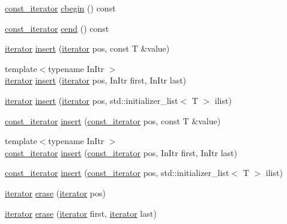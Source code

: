 \begin{DoxyCompactItemize}
\item 
\hyperlink{classsc_1_1list_1_1const__iterator}{const\+\_\+iterator} \hyperlink{classsc_1_1list_ab128f2a6caa171927474485d9d2f05fc}{cbegin} () const
\item 
\hyperlink{classsc_1_1list_1_1const__iterator}{const\+\_\+iterator} \hyperlink{classsc_1_1list_a058f029ebf0d6b5d66c78bb028b45eda}{cend} () const
\item 
\hyperlink{classsc_1_1list_1_1iterator}{iterator} \hyperlink{classsc_1_1list_a06b47c35531035c93c34d20b39277c99}{insert} (\hyperlink{classsc_1_1list_1_1iterator}{iterator} pos, const T \&value)
\item 
{\footnotesize template$<$typename In\+Itr $>$ }\\\hyperlink{classsc_1_1list_1_1iterator}{iterator} \hyperlink{classsc_1_1list_a50f5e86e5e8e4bce9ea2401a38a4719a}{insert} (\hyperlink{classsc_1_1list_1_1iterator}{iterator} pos, In\+Itr first, In\+Itr last)
\item 
\hyperlink{classsc_1_1list_1_1iterator}{iterator} \hyperlink{classsc_1_1list_a4de4bcd7f91152013c60134dd836d3b5}{insert} (\hyperlink{classsc_1_1list_1_1iterator}{iterator} pos, std\+::initializer\+\_\+list$<$ T $>$ ilist)
\item 
\hyperlink{classsc_1_1list_1_1const__iterator}{const\+\_\+iterator} \hyperlink{classsc_1_1list_a31c2bd11beedf339ba709e61330daf57}{insert} (\hyperlink{classsc_1_1list_1_1const__iterator}{const\+\_\+iterator} pos, const T \&value)
\item 
{\footnotesize template$<$typename In\+Itr $>$ }\\\hyperlink{classsc_1_1list_1_1const__iterator}{const\+\_\+iterator} \hyperlink{classsc_1_1list_ad701ef0de9782ecc791994051c75f30c}{insert} (\hyperlink{classsc_1_1list_1_1const__iterator}{const\+\_\+iterator} pos, In\+Itr first, In\+Itr last)
\item 
\hyperlink{classsc_1_1list_1_1const__iterator}{const\+\_\+iterator} \hyperlink{classsc_1_1list_ada86bd4ad7c15b8b289835daa9e7310d}{insert} (\hyperlink{classsc_1_1list_1_1const__iterator}{const\+\_\+iterator} pos, std\+::initializer\+\_\+list$<$ T $>$ ilist)
\item 
\hyperlink{classsc_1_1list_1_1iterator}{iterator} \hyperlink{classsc_1_1list_a12a195a7ebaf3455f245caa852b44a9b}{erase} (\hyperlink{classsc_1_1list_1_1iterator}{iterator} pos)
\item 
\hyperlink{classsc_1_1list_1_1iterator}{iterator} \hyperlink{classsc_1_1list_ae796301c82f58d72d10ec7c30fb0b024}{erase} (\hyperlink{classsc_1_1list_1_1iterator}{iterator} first, \hyperlink{classsc_1_1list_1_1iterator}{iterator} last)

\end{DoxyCompactItemize}
